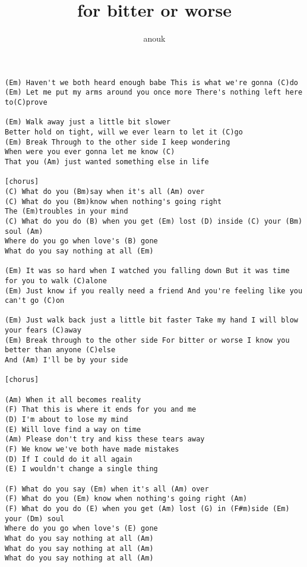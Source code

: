 \author{anouk}
\title{for bitter or worse}
\maketitle
\begin{verbatim}
(Em) Haven't we both heard enough babe This is what we're gonna (C)do
(Em) Let me put my arms around you once more There's nothing left here to(C)prove

(Em) Walk away just a little bit slower
Better hold on tight, will we ever learn to let it (C)go
(Em) Break Through to the other side I keep wondering
When were you ever gonna let me know (C)
That you (Am) just wanted something else in life 

[chorus]
(C) What do you (Bm)say when it's all (Am) over
(C) What do you (Bm)know when nothing's going right
The (Em)troubles in your mind 
(C) What do you do (B) when you get (Em) lost (D) inside (C) your (Bm) soul (Am)
Where do you go when love's (B) gone
What do you say nothing at all (Em)

(Em) It was so hard when I watched you falling down But it was time for you to walk (C)alone
(Em) Just know if you really need a friend And you're feeling like you can't go (C)on 

(Em) Just walk back just a little bit faster Take my hand I will blow your fears (C)away
(Em) Break through to the other side For bitter or worse I know you better than anyone (C)else
And (Am) I'll be by your side 

[chorus]

(Am) When it all becomes reality
(F) That this is where it ends for you and me
(D) I'm about to lose my mind
(E) Will love find a way on time
(Am) Please don't try and kiss these tears away
(F) We know we've both have made mistakes
(D) If I could do it all again
(E) I wouldn't change a single thing
 
(F) What do you say (Em) when it's all (Am) over
(F) What do you (Em) know when nothing's going right (Am)
(F) What do you do (E) when you get (Am) lost (G) in (F#m)side (Em) your (Dm) soul
Where do you go when love's (E) gone
What do you say nothing at all (Am)
What do you say nothing at all (Am)
What do you say nothing at all (Am)
\end{verbatim}